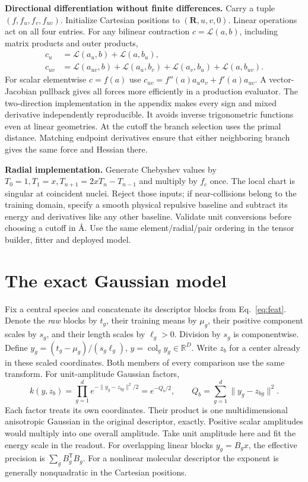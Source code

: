 \documentclass[11pt,a4paper]{article}
\newcommand{\R}{\mathbb R}\newcommand{\dd}{\mathrm d}
\newcommand{\T}{\mathsf T}\newcommand{\tr}{\operatorname{tr}}
\begin{document}
\textbf{Directional differentiation without finite differences.} Carry a tuple $(f,f_u,f_v,f_{uv})$. Initialize Cartesian positions to $(\mathbf R,u,v,0)$. Linear operations act on all four entries. For any bilinear contraction $c=\mathcal L(a,b)$, including matrix products and outer products,
\begin{align*}
 c_u&=\mathcal L(a_u,b)+\mathcal L(a,b_u),\\
 c_{uv}&=\mathcal L(a_{uv},b)+\mathcal L(a_u,b_v)+
          \mathcal L(a_v,b_u)+\mathcal L(a,b_{uv}).
\end{align*}
For scalar elementwise $c=f(a)$ use $c_{uv}=f''(a)a_u a_v+f'(a)a_{uv}$. A vector-Jacobian pullback gives all forces more efficiently in a production evaluator. The two-direction implementation in the appendix makes every sign and mixed derivative independently reproducible. It avoids inverse trigonometric functions even at linear geometries. At the cutoff the branch selection uses the primal distance. Matching endpoint derivatives ensure that either neighboring branch gives the same force and Hessian there.

\textbf{Radial implementation.} Generate Chebyshev values by $T_0=1,T_1=x,T_{n+1}=2xT_n-T_{n-1}$ and multiply by $f_c$ once. The local chart is singular at coincident nuclei. Reject those inputs; if near-collisions belong to the training domain, specify a smooth physical repulsive baseline and subtract its energy and derivatives like any other baseline. Validate unit conversions before choosing a cutoff in \AA. Use the same element/radial/pair ordering in the tensor builder, fitter and deployed model.
\pg\section{The exact Gaussian model}\label{sec:exact}
Fix a central species and concatenate its descriptor blocks from Eq.~\eqref{eq:feat}. Denote the \emph{raw} blocks by $t_g$, their training means by $\mu_g$, their positive component scales by $s_g$, and their length scales by $\ell_g>0$. Division by $s_g$ is componentwise. Define $y_g=(t_g-\mu_g)/(s_g\ell_g)$, $y=\operatorname{col}_g y_g\in\R^D$. Write $z_b$ for a center already in these scaled coordinates. Both members of every comparison use the same transform. For unit-amplitude Gaussian factors,
\begin{equation}
 k(y,z_b)=\prod_{g=1}^d e^{-\|y_g-z_{bg}\|^2/2}
         =e^{-Q_b/2},\qquad Q_b=\sum_{g=1}^{d}\|y_g-z_{bg}\|^2 .
 \label{eq:fuse}
\end{equation}
Each factor treats its own coordinates. Their product is one multidimensional anisotropic Gaussian in the original descriptor, exactly. Positive scalar amplitudes would multiply into one overall amplitude. Take unit amplitude here and fit the energy scale in the readout. For overlapping linear blocks $y_g=B_g x$, the effective precision is $\sum_g B_g^\T B_g$. For a nonlinear molecular descriptor the exponent is generally nonquadratic in the Cartesian positions.
\end{document}
